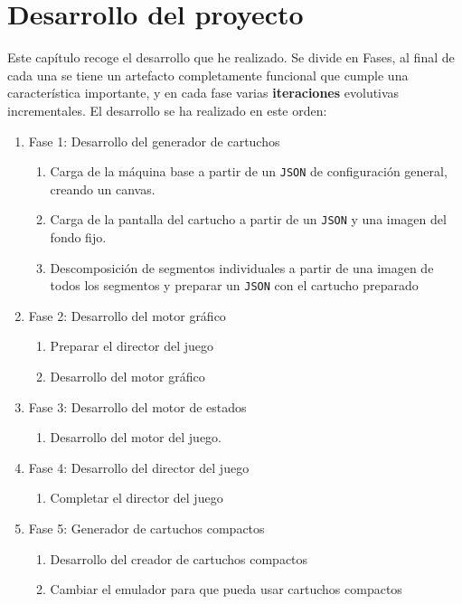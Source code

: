 \documentclass[../main.tex]{subfiles}
\begin{document}
	\chapter{Desarrollo del proyecto}
	\label{C:desarrollo}
	
	Este capítulo recoge el desarrollo que he realizado. Se divide en Fases, al final de cada una se tiene un artefacto completamente funcional que cumple una característica importante, y en cada fase varias \textbf{iteraciones} evolutivas incrementales. El desarrollo se ha realizado en este orden:
	
	\begin{enumerate}
		
		\item Fase 1: Desarrollo del generador de cartuchos
		\begin{enumerate}
			\item Carga de la máquina base a partir de un \texttt{JSON} de configuración general, creando un canvas.
			\item Carga de la pantalla del cartucho a partir de un \texttt{JSON} y una imagen del fondo fijo.
			\item Descomposición de segmentos individuales a partir de una imagen de todos los segmentos y preparar un \texttt{JSON} con el cartucho preparado
		\end{enumerate}
		
		\item Fase 2: Desarrollo del motor gráfico
		\begin{enumerate}
			\item Preparar el director del juego
			\item Desarrollo del motor gráfico	
		\end{enumerate}

		\item Fase 3: Desarrollo del motor de estados
		\begin{enumerate}
			\item Desarrollo del motor del juego.
		\end{enumerate}

		\item Fase 4: Desarrollo del director del juego
		\begin{enumerate}
			\item Completar el director del juego
		\end{enumerate}

		\item Fase 5: Generador de cartuchos compactos
		\begin{enumerate}
			\item Desarrollo del creador de cartuchos compactos
			\item Cambiar el emulador para que pueda usar cartuchos compactos
		\end{enumerate}


\end{enumerate}
\end{document}
